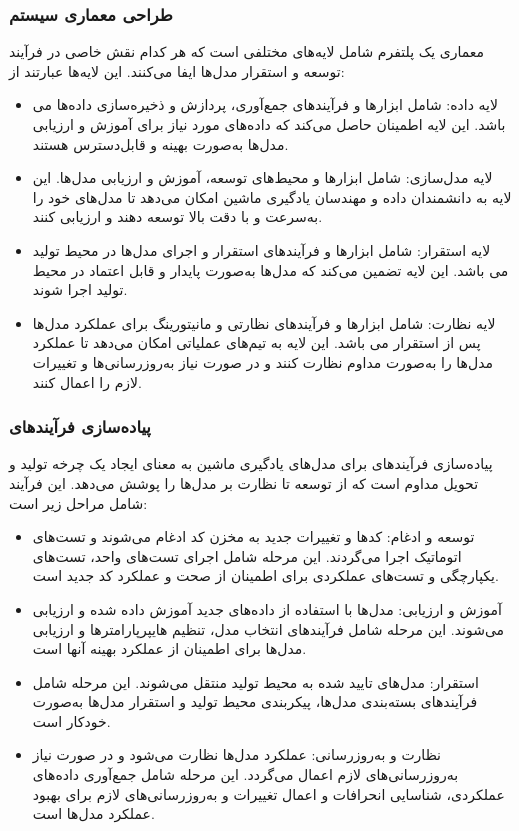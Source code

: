 \subsubsection{طراحی معماری سیستم}

معماری یک پلتفرم  شامل لایه‌های مختلفی است که هر کدام نقش خاصی در فرآیند توسعه و استقرار مدل‌ها ایفا می‌کنند. این لایه‌ها عبارتند از:

\begin{itemize}
	\item
لایه داده: شامل ابزارها و فرآیندهای جمع‌آوری، پردازش و ذخیره‌سازی داده‌ها می باشد. این لایه اطمینان حاصل می‌کند که داده‌های مورد نیاز برای آموزش و ارزیابی مدل‌ها به‌صورت بهینه و قابل‌دسترس هستند.
	\item 
لایه مدل‌سازی: شامل ابزارها و محیط‌های توسعه، آموزش و ارزیابی مدل‌ها. این لایه به دانشمندان داده و مهندسان یادگیری ماشین امکان می‌دهد تا مدل‌های خود را به‌سرعت و با دقت بالا توسعه دهند و ارزیابی کنند.
	\item
لایه استقرار: شامل ابزارها و فرآیندهای استقرار و اجرای مدل‌ها در محیط تولید می باشد. این لایه تضمین می‌کند که مدل‌ها به‌صورت پایدار و قابل اعتماد در محیط تولید اجرا شوند.
	\item
لایه نظارت: شامل ابزارها و فرآیندهای نظارتی و مانیتورینگ برای عملکرد مدل‌ها پس از استقرار می باشد. این لایه به تیم‌های عملیاتی امکان می‌دهد تا عملکرد مدل‌ها را به‌صورت مداوم نظارت کنند و در صورت نیاز به‌روزرسانی‌ها و تغییرات لازم را اعمال کنند.
\end{itemize}

\subsubsection{پیاده‌سازی فرآیندهای }

پیاده‌سازی فرآیندهای  برای مدل‌های یادگیری ماشین به معنای ایجاد یک چرخه تولید و تحویل مداوم است که از توسعه تا نظارت بر مدل‌ها را پوشش می‌دهد. این فرآیند شامل مراحل زیر است:

\begin{itemize}
	\item 
	توسعه و ادغام: کدها و تغییرات جدید به مخزن کد ادغام می‌شوند و تست‌های اتوماتیک اجرا می‌گردند. این مرحله شامل اجرای تست‌های واحد، تست‌های یکپارچگی و تست‌های عملکردی برای اطمینان از صحت و عملکرد کد جدید است.
	\item
	آموزش و ارزیابی: مدل‌ها با استفاده از داده‌های جدید آموزش داده شده و ارزیابی می‌شوند. این مرحله شامل فرآیندهای انتخاب مدل، تنظیم هایپرپارامترها و ارزیابی مدل‌ها برای اطمینان از عملکرد بهینه آنها است.
	\item
	استقرار: مدل‌های تایید شده به محیط تولید منتقل می‌شوند. این مرحله شامل فرآیندهای بسته‌بندی مدل‌ها، پیکربندی محیط تولید و استقرار مدل‌ها به‌صورت خودکار است.
	\item
	نظارت و به‌روزرسانی: عملکرد مدل‌ها نظارت می‌شود و در صورت نیاز به‌روزرسانی‌های لازم اعمال می‌گردد. این مرحله شامل جمع‌آوری داده‌های عملکردی، شناسایی انحرافات و اعمال تغییرات و به‌روزرسانی‌های لازم برای بهبود عملکرد مدل‌ها است.
\end{itemize}


